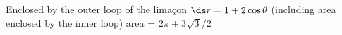 {Enclosed by the outer loop of the lima\c con $\ds r=1+2\cos\theta$ (including area enclosed by the inner loop)}
{area = $2\pi+3\sqrt{3}/2$
}
